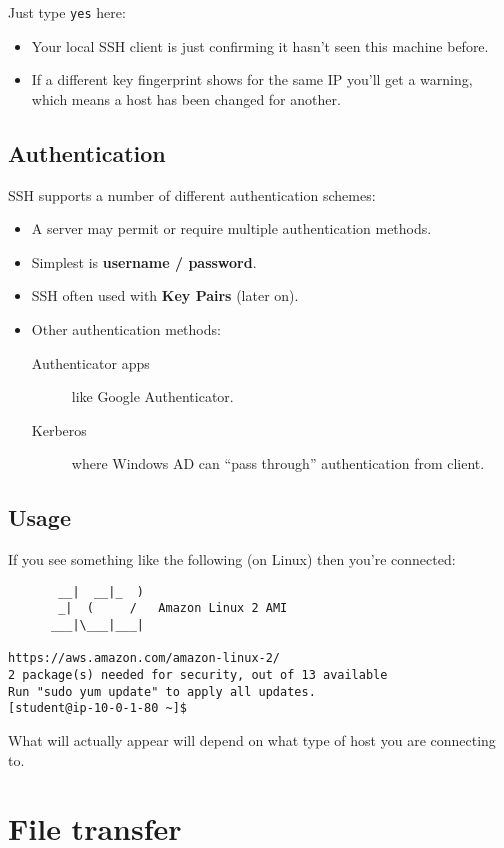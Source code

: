\documentclass[slides]{pgnotes}
\begin{document}
Just type \texttt{yes} here:
\begin{itemize}
\item Your local SSH client is just confirming it hasn't seen this machine before.
\item If a different key fingerprint shows for the same IP you'll get a warning, which means a host has been changed for another.
\end{itemize}


\subsection{Authentication}

SSH supports a number of different authentication schemes:
\begin{itemize}
\item A server may permit or require multiple authentication methods.
\item Simplest is \textbf{username / password}.
\item SSH often used with \textbf{Key Pairs} (later on).
\item Other authentication methods:
  \begin{description}
  \item[Authenticator apps] like Google Authenticator.
  \item[Kerberos] where Windows AD can ``pass through'' authentication from client.
  \end{description}
\end{itemize}

\subsection{Usage}

If you see something like the following (on Linux) then you're connected:

\begin{verbatim}
       __|  __|_  )
       _|  (     /   Amazon Linux 2 AMI
      ___|\___|___|

https://aws.amazon.com/amazon-linux-2/
2 package(s) needed for security, out of 13 available
Run "sudo yum update" to apply all updates.
[student@ip-10-0-1-80 ~]$
\end{verbatim}

What will actually appear will depend on what type of host you are connecting to.


\section{File transfer}
\end{document}

